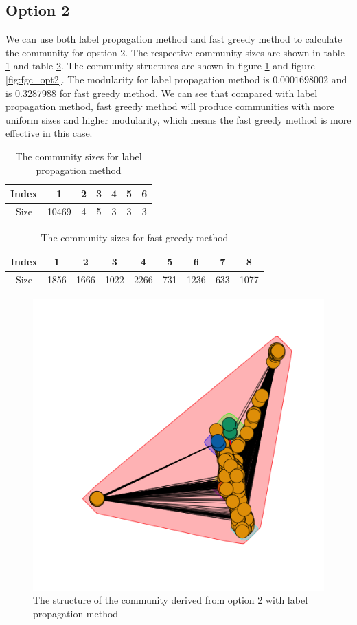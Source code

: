 \documentclass{article}
\begin{document}
\subsection{Option 2}
We can use both label propagation method and fast greedy method to calculate the community for opstion 2. The respective community sizes are shown in table \ref{tb:p3_comsize_lpc} and table \ref{tb:p3_comsize_fgc}. 
The community structures are shown in figure \ref{fig:lpc_opt2} and figure \ref{fig:fgc_opt2}. The modularity for label propagation method is $0.0001698002$ and is $0.3287988$ for fast greedy method.
We can see that compared with label propagation method, fast greedy method will produce communities with more uniform sizes and higher modularity, which means the fast greedy method is more effective in this case.
\begin {table}[htbp]
\caption{The community sizes for label propagation method}
\begin{adjustbox}{center}
\label{tb:p3_comsize_lpc}
\begin{tabular}{|c|c|c|c|c|c|c|}
\hline
Index&1&2&3&4&5&6\\
\hline
Size&10469&4&5&3&3&3\\
\hline
\end{tabular}
\end{adjustbox}
\end{table}

\begin {table}[htbp]
\caption{The community sizes for fast greedy method}
\begin{adjustbox}{center}
\label{tb:p3_comsize_fgc}
\begin{tabular}{|c|c|c|c|c|c|c|c|c|}
\hline
Index&1&2&3&4&5&6&7&8\\
\hline
Size&1856&1666&1022&2266&731&1236&633&1077\\
\hline
\end{tabular}
\end{adjustbox}
\end{table}


\begin{figure}[htbp]
\centering
\captionsetup{justification=centering,margin=2cm}
\includegraphics[width=.6\textwidth]{lpc_opt2.png}
\caption{The structure of the community derived from option 2 with label propagation method}
\label{fig:lpc_opt2}
\end{figure}
\end{document}
